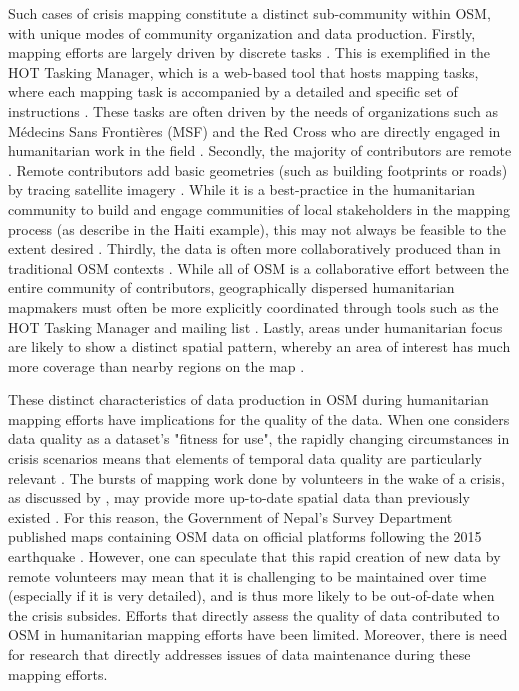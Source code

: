 Such cases of crisis mapping constitute a distinct sub-community within OSM, with unique modes of community organization and data production. Firstly, mapping efforts are largely driven by discrete tasks \parencite{vyncke_personal_2020}. This is exemplified in the HOT Tasking Manager, which is a web-based tool that hosts mapping tasks, 
 where each mapping task is accompanied by a detailed and specific set of instructions \parencite{humanitarian_openstreetmap_team_hot_2020}. These tasks are often driven by the needs of organizations such as Médecins Sans Frontières (MSF) and the Red Cross who are directly engaged in humanitarian work in the field \parencite{humanitarian_openstreetmap_team_hot_2020}. Secondly, the majority of contributors are remote \parencite{eckle_quality_2015, vyncke_personal_2020}. Remote contributors add basic geometries (such as building footprints or roads) by tracing satellite imagery \parencite{vyncke_humanitarian_2015}. While it is a best-practice in the humanitarian community to build and engage communities of local stakeholders in the mapping process (as \textcite{soden_crowdsourced_2014} describe in the Haiti example), this may not always be feasible to the extent desired \parencite{vyncke_personal_2020}. Thirdly, the data is often more collaboratively produced than in traditional OSM contexts \parencite{poiani_potential_2016, vyncke_personal_2020}. While all of OSM is a collaborative effort between the entire community of contributors, geographically dispersed humanitarian mapmakers must often be more explicitly coordinated through tools such as the HOT Tasking Manager and mailing list \parencite{palen_success_2015}. Lastly, areas under humanitarian focus are likely to show a distinct spatial pattern, whereby an area of interest has much more coverage than nearby regions on the map \parencite{anderson_crowd_2018}. 

These distinct characteristics of data production in OSM during humanitarian mapping efforts have implications for the quality of the data. When one considers data quality as a dataset’s "fitness for use", the rapidly changing circumstances in crisis scenarios means that elements of temporal data quality are particularly relevant \parencite{chen_coordination_2008}. The bursts of mapping work done by volunteers in the wake of a crisis, as discussed by \textcite{dittus_mass_2017}, may provide more up-to-date spatial data than previously existed \parencite{soden_crowdsourced_2014}. For this reason, the Government of Nepal’s Survey Department published maps containing OSM data on official platforms following the 2015 earthquake \parencite{soden_infrastructure_2016}. However, one can speculate that this rapid creation of new data by remote volunteers may mean that it is challenging to be maintained over time (especially if it is very detailed), and is thus more likely to be out-of-date when the crisis subsides. Efforts that directly assess the quality of data contributed to OSM in humanitarian mapping efforts have been limited. Moreover, there is need for research that directly addresses issues of data maintenance during these mapping efforts. 

